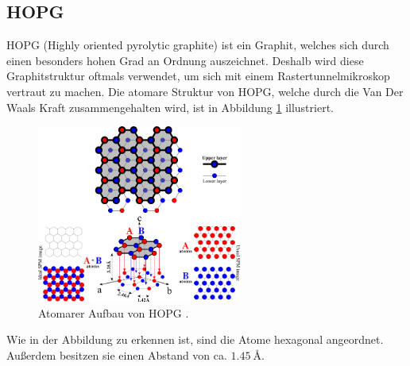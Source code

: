 \subsection{HOPG}
HOPG (Highly oriented pyrolytic graphite) ist ein Graphit, welches sich durch einen besonders hohen Grad
an Ordnung auszeichnet. Deshalb wird diese Graphitstruktur oftmals verwendet, um sich mit einem Rastertunnelmikroskop vertraut zu machen.
Die atomare Struktur von HOPG, welche durch die Van Der Waals Kraft zusammengehalten wird,
ist in Abbildung \ref{fig: hopg} illustriert.
\begin{figure}[!h]
  \centering
  \includegraphics[width=0.6\textwidth]{./pics/hopg.jpg}
  \caption{Atomarer Aufbau von HOPG \cite{hopg}.}
  \label{fig: hopg}
\end{figure}
Wie in der Abbildung zu erkennen ist, sind die Atome hexagonal angeordnet. Außerdem besitzen sie einen Abstand von ca.
$\SI{1.45}{\angstrom}$.

